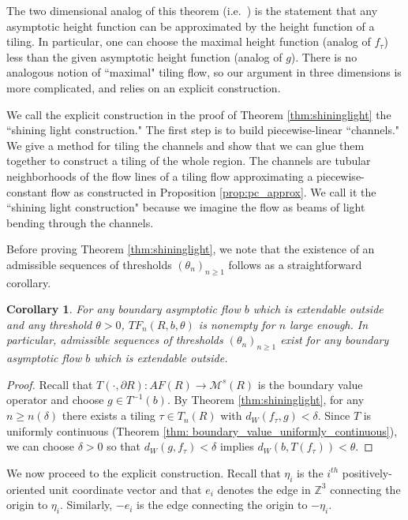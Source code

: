 \documentclass[11pt]{article}
\newtheorem{cor}[thm]{Corollary}
\theoremstyle{remark}
\theoremstyle{definition}
\newcommand{\mc}[1]{\mathcal{#1}}
\newcommand{\m}[1]{\mathbb{#1}}
\begin{document}
The two dimensional analog of this theorem (i.e.\ \cite[Prop.\,3.2]{cohn2001variational}) is the statement that any asymptotic height function can be approximated by the height function of a tiling. In particular, one can choose the maximal height function (analog of $f_\tau$) less than the given asymptotic height function (analog of $g$). There is no analogous notion of ``maximal" tiling flow, so our argument in three dimensions is more complicated, and relies on an explicit construction.

We call the explicit construction in the proof of Theorem \ref{thm:shininglight} the ``shining light construction." The first step is to build piecewise-linear ``channels." We give a method for tiling the channels and show that we can glue them together to construct a tiling of the whole region. The channels are tubular neighborhoods of the flow lines of a tiling flow approximating a piecewise-constant flow as constructed in Proposition \ref{prop:pc_approx}.  We call it the ``shining light construction" because we imagine the flow as beams of light bending through the channels. 


Before proving Theorem \ref{thm:shininglight}, we note that the existence of an admissible sequences of thresholds $(\theta_n)_{n\geq 1}$ follows as a straightforward corollary. 
\begin{cor}\label{cor:good_thresholds_exist}
    For any boundary asymptotic flow $b$ which is extendable outside and any threshold $\theta>0$, $TF_n(R, b, \theta)$ is nonempty for $n$ large enough. In particular, admissible sequences of thresholds $(\theta_n)_{n\geq 1}$ exist for any boundary asymptotic flow $b$ which is extendable outside. 
\end{cor}
\begin{proof}
    Recall that $T(\cdot, \partial R): AF(R)\to \mc M^s(R)$ is the boundary value operator and choose $g\in T^{-1}(b)$. By Theorem \ref{thm:shininglight}, for any $n\geq n(\delta)$ there exists a tiling $\tau \in T_n(R)$ with $d_W(f_\tau,g)<\delta$. Since $T$ is uniformly continuous (Theorem \ref{thm: boundary_value_uniformly_continuous}), we can choose $\delta>0$ so that $d_W(g,f_\tau)<\delta$ implies $d_W(b,T(f_\tau)) <\theta$.
\end{proof}



We now proceed to the explicit construction. Recall that $\eta_i$ is the $i^{th}$ positively-oriented unit coordinate vector and that $e_i$ denotes the edge in $\m Z^3$ connecting the origin to $\eta_i$. Similarly, $-e_i$ is the edge connecting the origin to $-\eta_i$. 
\end{document}
